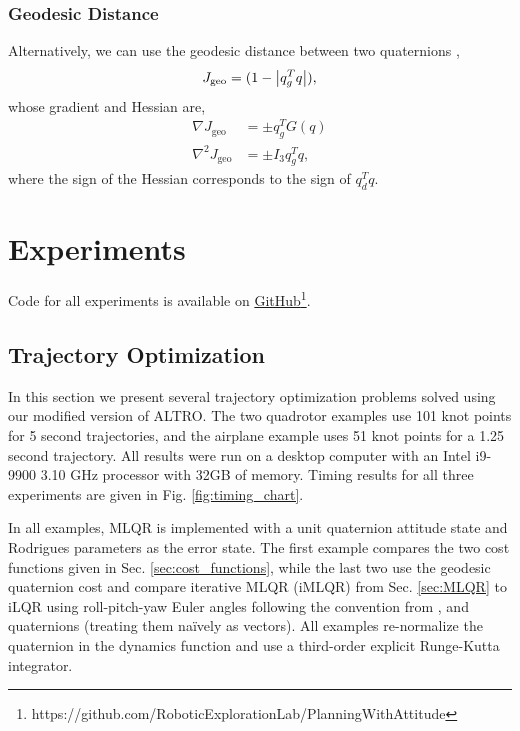 \documentclass[letterpaper, 10 pt, conference]{ieeeconf}  %
\begin{document}
        \subsubsection{Geodesic Distance}
            Alternatively, we can use the geodesic distance between two quaternions
            \cite{Kuffner2004},
            \begin{equation} \label{eq:quat_geodesic}
                J_\text{geo} = (1-\abs{q_g^T q}) ,
            \end{equation}
            whose gradient and Hessian are,
            \begin{align}
                \nabla J_\text{geo} &= \pm q_g^T G(q) \\
                \nabla^2 J_\text{geo} &= \pm I_3 q_g^T q ,
            \end{align}
            where the sign of the Hessian corresponds to the sign of $q_d^T q$.


\section{Experiments} \label{sec:experiments}
    Code for all experiments is available on 
    \href{https://github.com/RoboticExplorationLab/PlanningWithAttitude}
    {GitHub\footnote{\url{https://github.com/RoboticExplorationLab/PlanningWithAttitude}}}.
        
    \subsection{Trajectory Optimization}
        In this section we present several trajectory optimization problems solved using
        our modified version of ALTRO. The two quadrotor examples use 101 knot points for
        5 second trajectories, and the airplane example uses 51 knot points for a 1.25
        second trajectory. All results were run on a desktop computer with an Intel
        i9-9900 3.10 GHz processor with 32GB of memory. Timing results for all three
        experiments are given in Fig. \ref{fig:timing_chart}.
        
        In all examples, MLQR is implemented with a unit quaternion attitude state and
        Rodrigues parameters as the error state. The first example compares the two cost
        functions given in Sec. \ref{sec:cost_functions}, while the last two use the
        geodesic quaternion cost and compare iterative MLQR (iMLQR) from Sec.
        \ref{sec:MLQR} to iLQR using roll-pitch-yaw Euler angles following the convention
        from \cite{michael2010grasp}, and quaternions (treating them na\"ively as
        vectors). All examples re-normalize the quaternion in the dynamics function and
        use a third-order explicit Runge-Kutta integrator.
        
\end{document}
